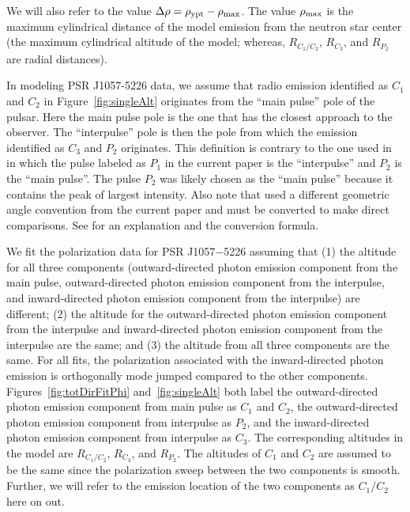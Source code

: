 We will also refer to the value $\Delta\rho=\rho_{\rm{ypt}}-\rho_{\rm{max}}$.
The value $\rho_{\rm{max}}$ is the maximum cylindrical distance 
of the model emission
from the neutron star
center (the maximum cylindrical altitude of the model;
whereas, $R_{C_1/C_2}$, $R_{C_3}$, and $R_{P_2}$ are radial distances).  

In modeling PSR J1057-5226 data, we assume that radio emission identified as $C_1$ and $C_2$ in
Figure~\ref{fig:singleAlt} originates from the ``main pulse''
pole of the pulsar. 
Here the main pulse pole is the one that has the
closest approach to the observer. The ``interpulse'' pole is then the
pole from which the emission identified as $C_3$ and $P_2$ originates. This
definition is contrary to the one used in \cite{weltevrede2009mapping} in which the
pulse labeled as $P_1$ in the current paper is the ``interpulse'' and $P_2$
is the ``main pulse''. The pulse $P_2$ was likely chosen as the
``main pulse'' because it contains the peak of largest intensity. Also
note that \cite{weltevrede2009mapping} used a different geometric angle
convention from the current paper and must be converted to make direct
comparisons. See \cite{everett2001emission} for an explanation and the
conversion formula.

We fit the polarization data for PSR J1057$-$5226 assuming that (1) the altitude 
for all three components (outward-directed photon emission component from the main pulse, outward-directed photon emission component from the interpulse, 
and inward-directed photon emission component from the interpulse) are different; (2) the altitude
for the outward-directed photon emission component from the interpulse and inward-directed photon emission component from the interpulse
are the same; and (3) the altitude from all three components are the same.
For all fits, the polarization associated with the inward-directed photon emission is orthogonally 
mode jumped compared to the other components.
Figures~\ref{fig:totDirFitPhi} and~\ref{fig:singleAlt} both label the 
outward-directed photon emission component from main pulse as $C_1$ and $C_2$, 
the outward-directed photon emission component from interpulse as $P_2$,
and the inward-directed photon emission component from interpulse as $C_3$.  The corresponding 
altitudes in the model are $R_{C_1/C_2}$, $R_{C_3}$, and $R_{P_2}$.
The altitudes of $C_1$ and $C_2$ are assumed to be the same since the
polarization sweep between the two components is smooth.  
Further, we will refer to the emission location of the two
components as $C_1/C_2$ here on out.

